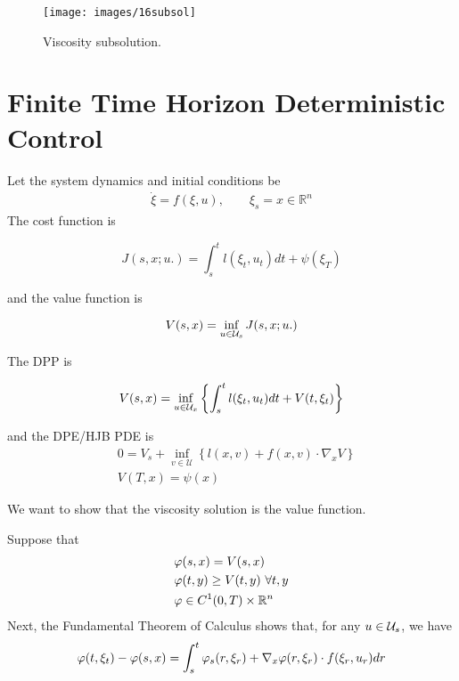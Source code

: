 \begin{figure}[ht!]
\centering
\texttt{[image: images/16subsol]}
\caption{Viscosity subsolution.}%
\label{fig:16subsol}
\end{figure}

\section{Finite Time Horizon Deterministic Control}
Let the system dynamics and initial conditions be
\begin{align*}
\dot{\xi} = f(\xi,u), \qquad \xi_s=x\in\mathbb{R}^n
\end{align*}
The cost function is

\begin{equation*}
J(s,x;u.) = \int_s^t l(\xi_t,u_t)dt+\psi(\xi_T)
\end{equation*}

and the value function is

\begin{equation*}
V(s,x) = \inf_{u\in\mathcal{U}_s}J(s,x;u.)
\end{equation*}

The DPP is

\begin{equation*}
V(s,x) = \inf_{u\in\mathcal{U}_x}\left\lbrace \int_s^t l(\xi_t,u_t)dt+V(t,\xi_t) \right\rbrace
\end{equation*}

and the DPE/HJB PDE is
\begin{align}
\label{eq:16dpe}
&0 = V_s + \inf_{v\in\mathcal{U}}\left\lbrace l(x,v)+f(x,v)\cdot\nabla_x V\right\rbrace \\
&V(T,x) = \psi(x) \nonumber
\end{align}

We want to show that the viscosity solution is the value function.

Suppose that
\begin{align}
\label{eq:16vp}
\begin{split}
&\varphi(s,x)=V(s,x) \\
&\varphi(t,y)\geq V(t,y)~\forall t,y \\
&\varphi\in C^1(0,T)\times\mathbb{R}^n
\end{split}
\end{align}
Next, the Fundamental Theorem of Calculus shows that, for any $u\in\mathcal{U}_s$, we have
\begin{align}
\label{eq:16fund}
\varphi(t,\xi_t)-\varphi(s,x) = \int_s^t\varphi_s(r,\xi_r)+\nabla_x\varphi(r,\xi_r)\cdot f(\xi_r,u_r)dr
\end{align}

